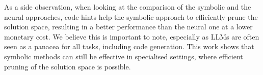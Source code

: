 \documentclass[sigconf,review,anonymous]{acmart}
\begin{document}
As a side observation, when looking at the comparison of the symbolic and the neural approaches, code hints help the symbolic approach to efficiently prune the solution space, resulting in a better performance than the neural one at a lower monetary cost. We believe this is important to note, especially as LLMs are often seen as a panacea for all tasks, including code generation. This work shows that symbolic methods can still be effective in specialised settings, where efficient pruning of the solution space is possible. 









\end{document}
